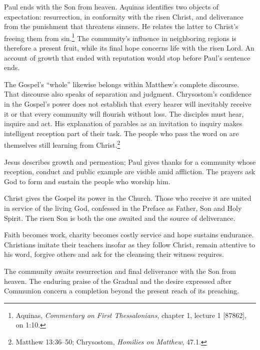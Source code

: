 Paul ends with the Son from heaven. Aquinas identifies two objects of expectation: resurrection, in conformity with the risen Christ, and deliverance from the punishment that threatens sinners. He relates the latter to Christ's freeing them from sin.\footnote{Aquinas, \textit{Commentary on First Thessalonians}, chapter 1, lecture 1 [87862], on 1:10.} The community's influence in neighboring regions is therefore a present fruit, while its final hope concerns life with the risen Lord. An account of growth that ended with reputation would stop before Paul's sentence ends.

The Gospel's ``whole'' likewise belongs within Matthew's complete discourse. That discourse also speaks of separation and judgment. Chrysostom's confidence in the Gospel's power does not establish that every hearer will inevitably receive it or that every community will flourish without loss. The disciples must hear, inquire and act. His explanation of parables as an invitation to inquiry makes intelligent reception part of their task. The people who pass the word on are themselves still learning from Christ.\footnote{Matthew 13:36--50; Chrysostom, \textit{Homilies on Matthew}, 47.1.}

\begin{fourSenses}
\item[Literal.] Jesus describes growth and permeation; Paul gives thanks for a community whose reception, conduct and public example are visible amid affliction. The prayers ask God to form and sustain the people who worship him.
\item[Allegorical.] Christ gives the Gospel its power in the Church. Those who receive it are united in service of the living God, confessed in the Preface as Father, Son and Holy Spirit. The risen Son is both the one awaited and the source of deliverance.
\item[Moral.] Faith becomes work, charity becomes costly service and hope sustains endurance. Christians imitate their teachers insofar as they follow Christ, remain attentive to his word, forgive others and ask for the cleansing their witness requires.
\item[Anagogical.] The community awaits resurrection and final deliverance with the Son from heaven. The enduring praise of the Gradual and the desire expressed after Communion concern a completion beyond the present reach of its preaching.
\end{fourSenses}
